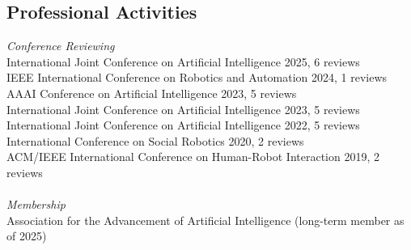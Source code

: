 \documentclass[margin, 10pt]{res} %
\begin{document}
\begin{resume}

\section{Professional Activities}

{\sl Conference Reviewing}\\
International Joint Conference on Artificial Intelligence \hfill 2025, 6 reviews\\
IEEE International Conference on Robotics and Automation \hfill 2024, 1 reviews\\
AAAI Conference on Artificial Intelligence \hfill 2023, 5 reviews\\
International Joint Conference on Artificial Intelligence \hfill 2023, 5 reviews\\
International Joint Conference on Artificial Intelligence  \hfill 2022, 5 reviews\\
International Conference on Social Robotics \hfill 2020, 2 reviews\\
ACM/IEEE International Conference on Human-Robot Interaction \hfill 2019, 2 reviews\\~\\
{\sl Membership}\\
Association for the Advancement of Artificial Intelligence (long-term member as of 2025)\\





\end{resume}
\end{document}
